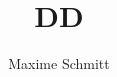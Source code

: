 \documentclass{report}
\title{DD}
\author{Maxime Schmitt}
\begin{document}
\maketitle
\begin{verbatim}
\end{verbatim}
\end{document}
